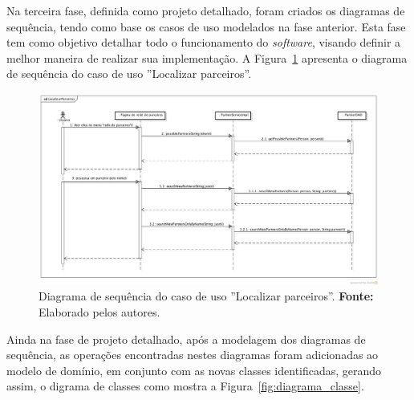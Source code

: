 \par Na terceira fase, definida como projeto detalhado, foram criados os diagramas de sequência, tendo como base os casos de uso modelados na fase anterior. Esta fase tem como objetivo detalhar todo o funcionamento do \textit{software}, visando definir a melhor maneira de realizar sua implementação. A Figura~\ref{fig:diagrama_sequencia_localizar_parceiros} apresenta o diagrama de sequência do caso de uso ''Localizar parceiros''.

\newpage
\begin{figure}[h!]
	\centerline{\includegraphics[angle=90,scale=0.4]{./imagens/apendices/diagrama-sequencia-localizar-parceiros.png}}
	\caption[Diagrama de sequência do caso de uso ''Localizar parceiros'']
	{Diagrama de sequência do caso de uso ''Localizar parceiros''. \textbf{Fonte:} Elaborado pelos autores.}
	\label{fig:diagrama_sequencia_localizar_parceiros}
\end{figure}

\par Ainda na fase de projeto detalhado, após a modelagem dos diagramas de sequência, as operações encontradas nestes diagramas foram adicionadas ao modelo de domínio, em conjunto com as novas classes identificadas, gerando assim, o digrama de classes como mostra a Figura~\ref{fig:diagrama_classe}.

